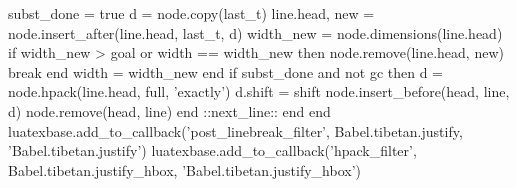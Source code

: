 {{          subst_done = true
          d = node.copy(last_t)
          line.head, new = node.insert_after(line.head, last_t, d)
          width_new = node.dimensions(line.head)
          if width_new > goal or width == width_new then
            node.remove(line.head, new) %
            break
          end
          width = width_new
        end
        if subst_done and not gc then
          d = node.hpack(line.head, full, 'exactly')
          d.shift = shift
          node.insert_before(head, line, d)
          node.remove(head, line)
        end
        ::next_line::
      end %
    end
    luatexbase.add_to_callback('post_linebreak_filter',
      Babel.tibetan.justify, 'Babel.tibetan.justify')
    luatexbase.add_to_callback('hpack_filter',
      Babel.tibetan.justify_hbox, 'Babel.tibetan.justify_hbox')
  }}
  
\fi

\endinput